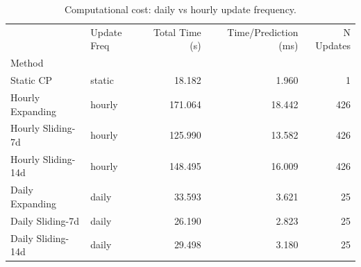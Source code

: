 \begin{table}
\caption{Computational cost: daily vs hourly update frequency.}
\label{tab:t5b6_computational_cost}
\begin{tabular}{llrrr}
\toprule
 & Update Freq & Total Time (s) & Time/Prediction (ms) & N Updates \\
Method &  &  &  &  \\
\midrule
Static CP & static & 18.182 & 1.960 & 1 \\
Hourly Expanding & hourly & 171.064 & 18.442 & 426 \\
Hourly Sliding-7d & hourly & 125.990 & 13.582 & 426 \\
Hourly Sliding-14d & hourly & 148.495 & 16.009 & 426 \\
Daily Expanding & daily & 33.593 & 3.621 & 25 \\
Daily Sliding-7d & daily & 26.190 & 2.823 & 25 \\
Daily Sliding-14d & daily & 29.498 & 3.180 & 25 \\
\bottomrule
\end{tabular}
\end{table}
